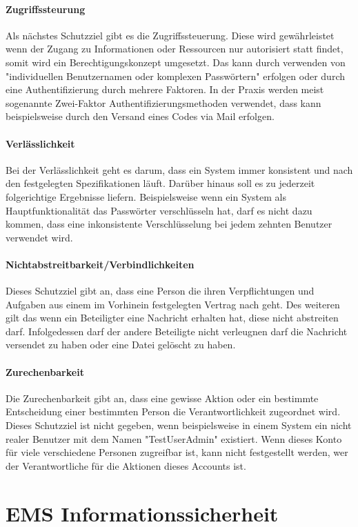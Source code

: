 \paragraph{Zugriffssteurung}
Als nächstes Schutzziel gibt es die Zugriffssteuerung. Diese wird gewährleistet wenn der Zugang zu Informationen oder Ressourcen nur autorisiert statt findet, somit wird ein Berechtigungskonzept umgesetzt. Das kann durch verwenden von "individuellen Benutzernamen oder komplexen Passwörtern" erfolgen oder durch eine Authentifizierung durch mehrere Faktoren. In der Praxis werden meist sogenannte Zwei-Faktor Authentifizierungsmethoden verwendet, dass kann beispielsweise durch den Versand eines Codes via Mail erfolgen.

\paragraph{Verlässlichkeit}
Bei der Verlässlichkeit geht es darum, dass ein System immer konsistent und nach den festgelegten Spezifikationen läuft. Darüber hinaus soll es zu jederzeit folgerichtige Ergebnisse liefern. Beispielsweise wenn ein System als Hauptfunktionalität das Passwörter verschlüsseln hat, darf es nicht dazu kommen, dass eine inkonsistente Verschlüsselung bei jedem zehnten Benutzer verwendet wird.

\paragraph{Nichtabstreitbarkeit/Verbindlichkeiten}
Dieses Schutzziel gibt an, dass eine Person die ihren Verpflichtungen und Aufgaben aus einem im Vorhinein festgelegten Vertrag nach geht. Des weiteren gilt das wenn ein Beteiligter eine Nachricht erhalten hat, diese nicht abstreiten darf. Infolgedessen darf der andere Beteiligte nicht verleugnen darf die Nachricht versendet zu haben oder eine Datei gelöscht zu haben.


\paragraph{Zurechenbarkeit}
Die Zurechenbarkeit gibt an, dass eine gewisse Aktion oder ein bestimmte Entscheidung einer bestimmten Person die Verantwortlichkeit zugeordnet wird. Dieses Schutzziel ist nicht gegeben, wenn beispielsweise in einem System ein nicht realer Benutzer mit dem Namen "TestUserAdmin" existiert. Wenn dieses Konto für viele verschiedene Personen zugreifbar ist, kann nicht festgestellt werden, wer der Verantwortliche für die Aktionen dieses Accounts ist.


\section{EMS Informationssicherheit}


\newpage